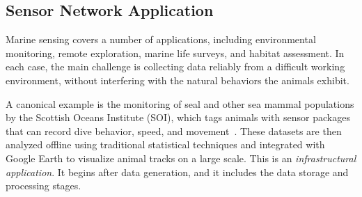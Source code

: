 %
%
%
%
%
%
%
%
%
%
%
%
%
%



\subsection{Sensor Network Application \label{sensorSimon}}

%




Marine sensing covers a number of applications, including
environmental monitoring, remote exploration, marine life surveys, and
habitat assessment. In each case, the main challenge is collecting
data reliably from a difficult working
environment, without interfering with the natural behaviors the
animals exhibit.

A canonical example is the monitoring of seal and other sea mammal
populations by the Scottish Oceans Institute (SOI), which tags animals
with sensor packages that can record dive behavior, speed, and
movement~\cite{SMSSeal,SealContact}.  These datasets are then analyzed
offline using traditional statistical techniques and integrated with
Google Earth to visualize animal tracks on a large scale.  This is an
{\em infrastructural application}. It begins after data generation,
and it includes the data storage and processing stages.

